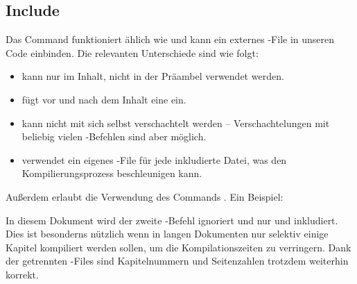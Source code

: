 \subsection{Include}
Das Command  funktioniert ählich wie  und kann ein externes -File in unseren Code einbinden.
Die relevanten Unterschiede sind wie folgt:
\begin{itemize}
	\item {} kann nur im Inhalt, nicht in der Präambel verwendet werden.
	\item {} fügt vor und nach dem Inhalt eine  ein.
	\item {} kann nicht mit sich selbst verschachtelt werden -- Verschachtelungen mit beliebig vielen -Befehlen sind aber möglich.
	\item {} verwendet ein eigenes -File für jede inkludierte Datei, was den Kompilierungsprozess beschleunigen kann.
\end{itemize}
Außerdem erlaubt  die Verwendung des Commands .
Ein Beispiel:
In diesem Dokument wird der zweite -Befehl ignoriert und nur  und  inkludiert.
Dies ist besonderns nützlich wenn in langen Dokumenten nur selektiv einige Kapitel kompiliert werden sollen, um die Kompilationszeiten zu verringern.
Dank der getrennten -Files sind Kapitelnummern und Seitenzahlen trotzdem weiterhin korrekt.

